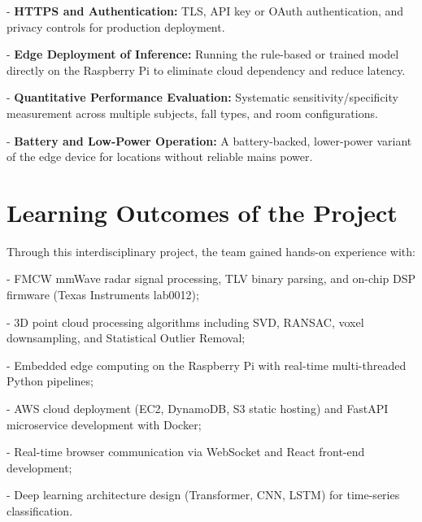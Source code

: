 - \textbf{HTTPS and Authentication:} TLS, API key or OAuth authentication, and privacy controls for production deployment. 

- \textbf{Edge Deployment of Inference:} Running the rule-based or trained model directly on the Raspberry Pi to eliminate cloud dependency and reduce latency. 

- \textbf{Quantitative Performance Evaluation:} Systematic sensitivity/specificity measurement across multiple subjects, fall types, and room configurations. 

- \textbf{Battery and Low-Power Operation:} A battery-backed, lower-power variant of the edge device for locations without reliable mains power. 

\section{Learning Outcomes of the Project}

Through this interdisciplinary project, the team gained hands-on experience with: 

- FMCW mmWave radar signal processing, TLV binary parsing, and on-chip DSP firmware (Texas Instruments lab0012); 

- 3D point cloud processing algorithms including SVD, RANSAC, voxel downsampling, and Statistical Outlier Removal; 

- Embedded edge computing on the Raspberry Pi with real-time multi-threaded Python pipelines; 

- AWS cloud deployment (EC2, DynamoDB, S3 static hosting) and FastAPI microservice development with Docker; 

- Real-time browser communication via WebSocket and React front-end development; 


- Deep learning architecture design (Transformer, CNN, LSTM) for time-series classification. 


